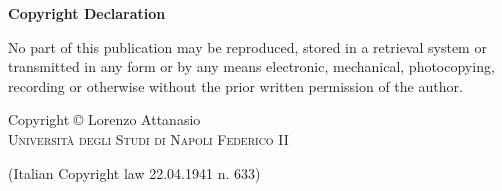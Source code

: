 %
%
%
%


\thispagestyle{empty}
\vspace*{\fill}
{
\begin{center}
{\bf Copyright Declaration}
\end{center}

\centering
\begin{minipage}{0.85\textwidth}
No part of this publication may be reproduced, stored in a retrieval system or transmitted in any form or by any means electronic, mechanical, photocopying, recording or otherwise without the prior written permission of the author.
\end{minipage}

\bigskip

\centering Copyright © Lorenzo Attanasio\\
\textsc{Università degli Studi di Napoli Federico II}

\medskip
\hfil (Italian Copyright law 22.04.1941 n. 633)
}%
